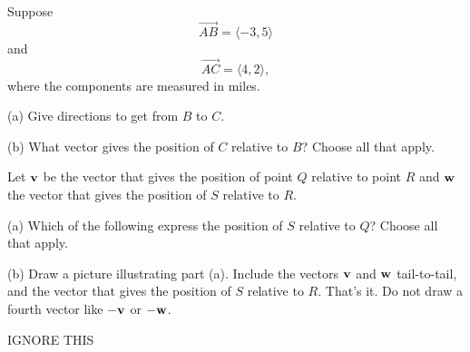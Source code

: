 \documentclass{ximera}
\begin{document}
\begin{question}  \label{Qsdfsdt4r3:Vectors}
Suppose
\[
 \overrightarrow{AB} = \langle  -3,5 \rangle
\]
and
\[
   \overrightarrow{AC} = \langle  4,2 \rangle ,
\]
where the components are measured in miles.

(a) Give directions to get from $B$ to $C$.

(b) What vector gives the position of $C$ relative to $B$? Choose all that apply.
\begin{multipleChoice} 
\end{multipleChoice} 

\end{question}





\begin{question}  \label{Q234r3:Vectors}
Let ${\bf v}$ be the vector that gives the position of point $Q$ relative to point $R$ and ${\bf w}$ the vector that gives the position of $S$ relative to $R$. 

(a) Which of the following express the position of $S$ relative to $Q$? Choose all that apply.

\begin{selectAll}  
\end{selectAll}

(b) Draw a picture illustrating part (a). Include the vectors ${\bf v}$ and ${\bf w}$ tail-to-tail, and the vector that gives the position of $S$ relative to $R$. That's it. Do not draw a fourth vector like $-{\bf v}$ or $-{\bf w}$.


\end{question}



IGNORE THIS

 
\begin{onlineOnly}
    \begin{center}
\end{center}
\end{onlineOnly}
\end{document}
